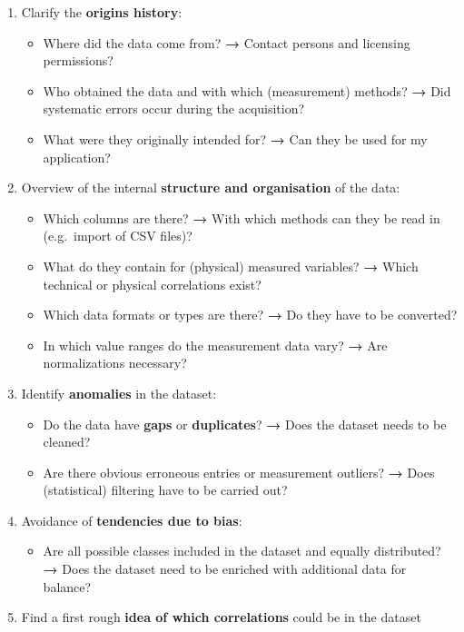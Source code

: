 \documentclass [oneside,10pt,a4paper,ngerman,BCOR10mm,headsepline,parindent,final]{scrartcl}
\providecommand{\tightlist}{%
      \setlength{\itemsep}{0pt}\setlength{\parskip}{0pt}}
\begin{document}
\begin{enumerate}
\def\labelenumi{\arabic{enumi}.}
\tightlist
\item
  Clarify the \textbf{origins history}:

  \begin{itemize}
  \tightlist
  \item
    Where did the data come from? \textbf{→} Contact persons and
    licensing permissions?
  \item
    Who obtained the data and with which (measurement) methods?
    \textbf{→} Did systematic errors occur during the acquisition?
  \item
    What were they originally intended for? \textbf{→} Can they be used
    for my application?
  \end{itemize}
\item
  Overview of the internal \textbf{structure and organisation} of the
  data:

  \begin{itemize}
  \tightlist
  \item
    Which columns are there? \textbf{→} With which methods can they be
    read in (e.g.~import of CSV files)?
  \item
    What do they contain for (physical) measured variables? \textbf{→}
    Which technical or physical correlations exist?
  \item
    Which data formats or types are there? \textbf{→} Do they have to be
    converted?
  \item
    In which value ranges do the measurement data vary? \textbf{→} Are
    normalizations necessary?
  \end{itemize}
\item
  Identify \textbf{anomalies} in the dataset:

  \begin{itemize}
  \tightlist
  \item
    Do the data have \textbf{gaps} or \textbf{duplicates}? \textbf{→}
    Does the dataset needs to be cleaned?
  \item
    Are there obvious erroneous entries or measurement outliers?
    \textbf{→} Does (statistical) filtering have to be carried out?
  \end{itemize}
\item
  Avoidance of \textbf{tendencies due to bias}:

  \begin{itemize}
  \tightlist
  \item
    Are all possible classes included in the dataset and equally
    distributed? \textbf{→} Does the dataset need to be enriched with
    additional data for balance?
  \end{itemize}
\item
  Find a first rough \textbf{idea of which correlations} could be in the
  dataset
\end{enumerate}
\end{document}
